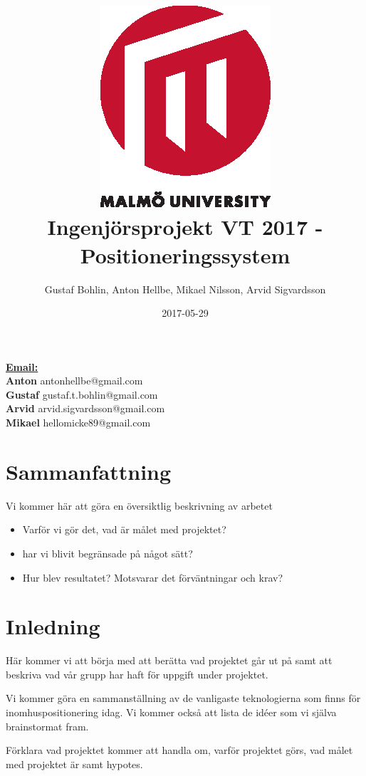 \documentclass[11pt, a4paper]{report}
\title{\includegraphics{mah_logo.eps} \\[2 cm] Ingenjörsprojekt VT 2017 - Positioneringssystem}
\author{Gustaf Bohlin, Anton Hellbe, Mikael Nilsson, Arvid Sigvardsson}
\date{2017-05-29}
\begin{document}
\begin{titlepage}
\maketitle

\vfill
\begin{flushleft}
{\bf \underline{Email:}} \\
{\bf Anton} antonhellbe@gmail.com \\
{\bf Gustaf} gustaf.t.bohlin@gmail.com \\
{\bf Arvid} arvid.sigvardsson@gmail.com\\
{\bf Mikael} hellomicke89@gmail.com \\




\end{flushleft}
\centering  
\thispagestyle{empty}
\clearpage
\end{titlepage}

\chapter{Sammanfattning} 
Vi kommer här att göra en översiktlig beskrivning av arbetet
\begin{itemize}
\item Varför vi gör det, vad är målet med projektet?
\item har vi blivit begränsade på något sätt?
\item Hur blev resultatet? Motsvarar det förväntningar och krav?

\end{itemize} 
\newpage
\setcounter{page}{0}
\tableofcontents
\thispagestyle{empty}
\clearpage



\chapter{Inledning}
Här kommer vi att börja med att berätta  vad projektet går ut på samt att beskriva vad vår grupp har haft för uppgift under projektet.

Vi kommer göra en sammanställning av de vanligaste teknologierna som finns för inomhuspositionering idag. Vi kommer också att lista de idéer som vi själva brainstormat fram.
 


Förklara vad projektet kommer att handla om, varför projektet görs, vad målet med projektet är samt hypotes.
\end{document}
